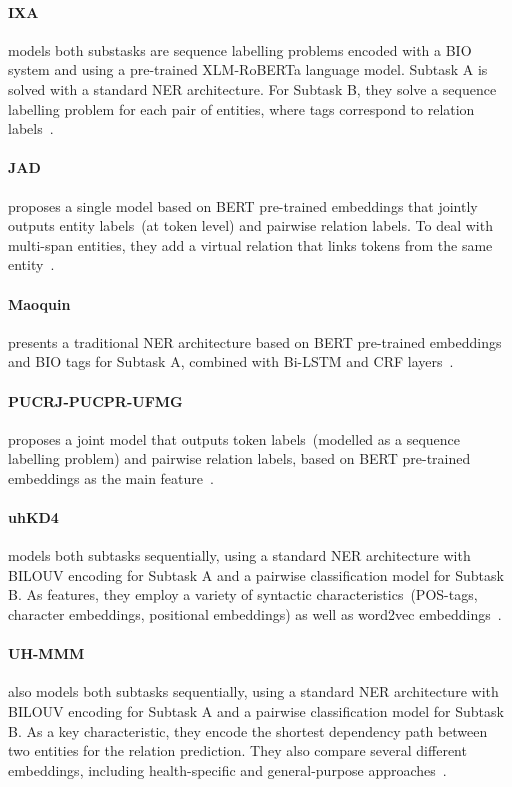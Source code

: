 \documentclass[a4paper,11pt,twocolumn,twoside]{article}
\begin{document}
  \paragraph{IXA} models both substasks are sequence labelling problems encoded with a BIO system and using a pre-trained XLM-RoBERTa language model. Subtask A is solved with a standard NER architecture. For Subtask B, they solve a sequence labelling problem for each pair of entities, where tags correspond to relation labels~\cite{edgarandres2021}.

  \paragraph{JAD} proposes a single model based on BERT pre-trained embeddings that jointly outputs entity labels~(at token level) and pairwise relation labels. To deal with multi-span entities, they add a virtual relation that links tokens from the same entity~\cite{JAD2021}.

  \paragraph{Maoquin} presents a traditional NER architecture based on BERT pre-trained embeddings and BIO tags for Subtask A, combined with Bi-LSTM and CRF layers~\cite{Maoqin2021}.

  \paragraph{PUCRJ-PUCPR-UFMG} proposes a joint model that outputs token labels~(modelled as a sequence labelling problem) and pairwise relation labels, based on BERT pre-trained embeddings as the main feature~\cite{lucas2021}.

  \paragraph{uhKD4} models both subtasks sequentially, using a standard NER architecture with BILOUV encoding for Subtask A and a pairwise classification model for Subtask B. As features, they employ a variety of syntactic characteristics~(POS-tags, character embeddings, positional embeddings) as well as word2vec embeddings~\cite{uhKD42021}.

  \paragraph{UH-MMM} also models both subtasks sequentially, using a standard NER architecture with BILOUV encoding for Subtask A and a pairwise classification model for Subtask B. As a key characteristic, they encode the shortest dependency path between two entities for the relation prediction. They also compare several different embeddings, including health-specific and general-purpose approaches~\cite{uhmmm2021}.
\end{document}
